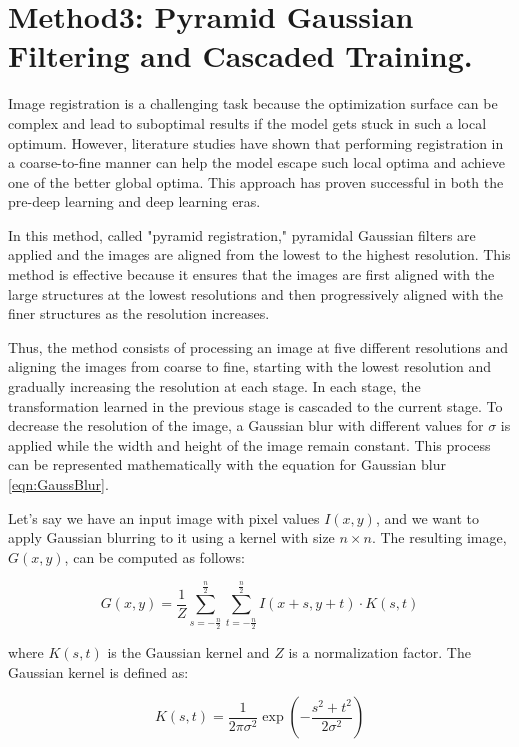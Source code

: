 \documentclass{report}
\begin{document}
	\section{Method3: Pyramid Gaussian Filtering and Cascaded Training.}
	Image registration is a challenging task because the optimization surface can be complex and lead to suboptimal results if the model gets stuck in such a local optimum. However, literature studies have shown that performing registration in a coarse-to-fine manner can help the model escape such local optima and achieve one of the better global optima. This approach has proven successful in both the pre-deep learning and deep learning eras.
	
	In this method, called "pyramid registration," pyramidal Gaussian filters are applied and the images are aligned from the lowest to the highest resolution. This method is effective because it ensures that the images are first aligned with the large structures at the lowest resolutions and then progressively aligned with the finer structures as the resolution increases.
	
	Thus, the method consists of processing an image at five different resolutions and aligning the images from coarse to fine, starting with the lowest resolution and gradually increasing the resolution at each stage. In each stage, the transformation learned in the previous stage is cascaded to the current stage. To decrease the resolution of the image, a Gaussian blur with different values for $\sigma$ is applied while the width and height of the image remain constant. This process can be represented mathematically with the equation for Gaussian blur \ref{eqn:GaussBlur}.
	
	Let's say we have an input image with pixel values $I(x, y)$, and we want to apply Gaussian blurring to it using a kernel with size $n \times n$. The resulting image, $G(x, y)$, can be computed as follows:
	
	\begin{equation}\label{eqn:GaussBlur}
		G(x, y) = \frac{1}{Z} \sum_{s=-\frac{n}{2}}^{\frac{n}{2}}\sum_{t=-\frac{n}{2}}^{\frac{n}{2}}I(x+s, y+t) \cdot K(s, t)
	\end{equation}
	
	where $K(s, t)$ is the Gaussian kernel and $Z$ is a normalization factor. The Gaussian kernel is defined as:
	
	\begin{equation}
		K(s, t) = \frac{1}{2\pi \sigma^2} \exp\left(-\frac{s^2+t^2}{2\sigma^2}\right)
	\end{equation}
	
\end{document}
